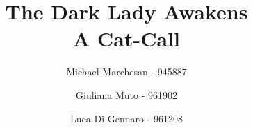 \begin{titlepage}

\title{The Dark Lady Awakens \\ A Cat-Call}
\author{Michael Marchesan - 945887 \and Giuliana Muto - 961902 \and Luca Di Gennaro - 961208}
\date{}
\maketitle

\end{titlepage}